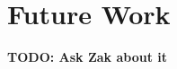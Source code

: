 \documentclass[12pt,chapterheads]{ucsd}
\begin{document}
\chapter{Future Work}
\textbf{TODO: Ask Zak about it}
\def\baselinestretch{1.0}  %
\end{document}
